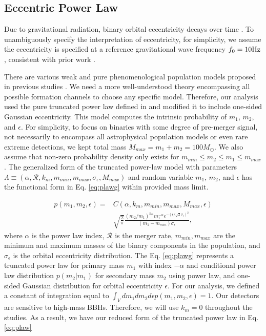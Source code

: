 \documentclass[twocolumn,prd,nofootinbib]{revtex4}
\newcommand\unit[1]{{\rm #1}}
\begin{document}
\subsection{Eccentric Power Law}


Due to gravitational radiation, binary orbital eccentricity decays over time \cite{Peters-1963}. To unambiguously specify
 the interpretation of eccentricity, for simplicity, we assume the eccentricity is specified at a reference
 gravitational wave frequency $f_0=10\unit{Hz}$, consistent with prior work \cite{favata-scaling-2022}.

There are various weak and pure phenomenological population models proposed in previous studies 
\cite{2016PRXAbbot_BBH_model,2017FishBach_BBH_model,2018talbot_bbh_model}. We need a more well-understood theory encompassing all possible formation channels to choose any
specific model. Therefore, our analysis used the pure truncated power law defined in 
\cite{2016PRXAbbot_BBH_model,2017FishBach_BBH_model} and modified it to 
include one-sided Gaussian eccentricity. This model computes the intrinsic probability 
of $m_1$, $m_2$, and $\epsilon$.
For simplicity, to focus on binaries with some degree of pre-merger signal, not necessarily to
encompass all astrophysical population models or even rare extreme detections, we kept 
total mass $M_{max}=m_1+m_2 = 100 M_\odot$. We also assume that non-zero probability density
only exists for $m_{min}\leq m_2 \leq m_1 \leq m_{max}$.
The generalized form of the truncated power-law model with parameters 
$\Lambda \equiv (\alpha, \mathcal{R}, k_m, m_{min}, m_{max}, \sigma_\epsilon, M_{max})$ and random variable 
$m_1$, $m_2$, and $\epsilon$ has the functional form in Eq. \ref{eq:plawg} within provided mass limit.


\begin{align}
\label{eq:plawg}
p(m_1,m_2,\epsilon) = &C(\alpha,k_m,m_{min},m_{max},M_{max},\epsilon)  
\nonumber \\ & \sqrt{\frac{2}{\pi}} \frac{(m_2/m_1)^{k_m} m_1^{-\alpha} e^{-(\epsilon/\sqrt{2}
\sigma_\epsilon)^2}}{(m_1-m_{min})\sigma_\epsilon},
\end{align}
%
where $\alpha$ is the power law index, $\mathcal{R}$ is the merger rate, $m_{min}, m_{max}$ are the minimum 
and maximum masses of the binary components in the population, and $\sigma_\epsilon$ is the orbital 
eccentricity distribution. The Eq. \ref{eq:plawg} represents a truncated power law for primary mass $m_1$ with 
index $-\alpha$ and conditional power law distribution $p(m_2|m_1)$ for secondary mass $m_2$ using power law, 
and one-sided Gaussian distribution for orbital eccentricity $\epsilon$. 
For our analysis, we defined a constant of integration equal to $\int_V dm_1 dm_2 d\epsilon p(m_1,m_2,\epsilon) 
= 1$.  Our detectors are sensitive to high-mass BBHs. Therefore, we will
use $k_m=0$ throughout the studies. As a result, we have our reduced form of the truncated power law in 
Eq. \ref{eq:plaw}
\end{document}
